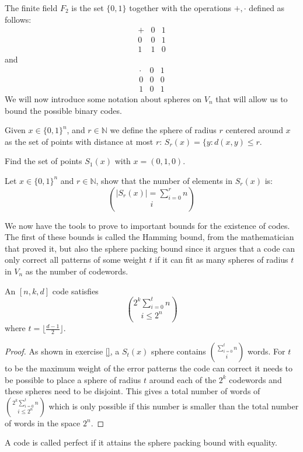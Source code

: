 The finite field $F_2$ is the set $\{0,1\}$ together with the operations $+,\cdot$ defined as follows:
$$\begin{array}{c|cc}
+ & 0 & 1 \\
\hline
0 & 0 & 1 \\
1 & 1 & 0 
\end{array}$$
and
$$\begin{array}{c|cc}
\cdot & 0 & 1 \\
\hline
0 & 0 & 0 \\
1 & 0 & 1 
\end{array}$$
We will now introduce some notation about spheres on $V_n$ that will allow us to bound the possible binary codes.
\begin{definition}
Given $x\in\{0,1\}^n$, and $r\in\mathbb N$ we define the sphere of radius $r$ centered around $x$ as the set of points with distance at most $r$: $S_r(x)=\{y:d(x,y)\leq r$.
\end{definition}
\begin{exercise}
Find the set of points $S_1(x)$ with $x=(0,1,0)$.
\end{exercise}
\begin{exercise}
Let $x\in\{0,1\}^n$ and $r\in\mathbb N$, show that the number of elements in $S_r(x)$ is:
\begin{equation}
\left|S_r(x)\right|=\sum_{i=0}^rn\choose i
\end{equation}
\end{exercise}
We now have the tools to prove to important bounds for the existence of codes. The first of these bounds is called the Hamming bound, from the mathematician that proved it, but also the sphere packing bound since it argues that a code can only correct all patterns of some weight $t$ if it can fit as many spheres of radius $t$ in $V_n$ as the number of codewords.
\begin{theorem}
An $[n,k,d]$ code satisfies 
\begin{equation}
2^k\sum_{i=0}^tn\choose i\leq 2^n
\end{equation}
where $t=\lfloor\frac{d-1}{2}\rfloor$.
\end{theorem}
\begin{proof}
As shown in exercise \ref{}, a $S_t(x)$ sphere contains $\sum_{i=0}^tn\choose i$ words. For $t$ to be the maximum weight of the error patterns the code can correct it needs to be possible to place a sphere of radius $t$ around each of the $2^k$ codewords and these spheres need to be disjoint. This gives a total number of words of $2^k\sum_{i=0}^tn\choose i\leq 2^n$ which is only possible if this number is smaller than the total number of words in the space $2^n$.
\end{proof}
A code is called perfect if it attains the sphere packing bound with equality.

